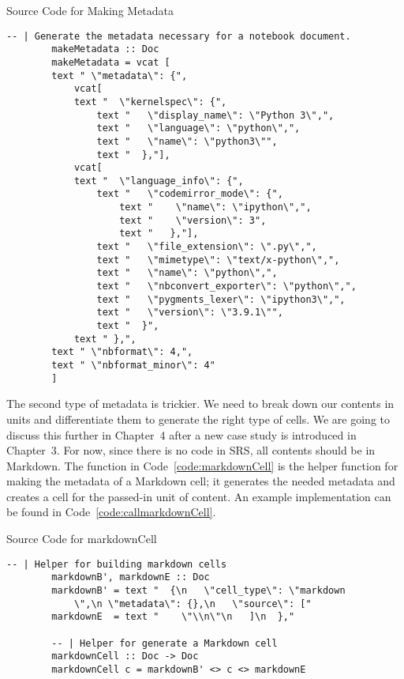 \begin{listing}[h]
	\caption{Source Code for Making Metadata}
	\label{code:makeMetadata}
	\begin{lstlisting}[language=haskell1, basicstyle=\small\ttfamily]
		-- | Generate the metadata necessary for a notebook document.
		makeMetadata :: Doc  
		makeMetadata = vcat [
		text " \"metadata\": {", 
			vcat[
			text "  \"kernelspec\": {", 
				text "   \"display_name\": \"Python 3\",", 
				text "   \"language\": \"python\",",
				text "   \"name\": \"python3\"", 
				text "  },"],
			vcat[
			text "  \"language_info\": {", 
				text "   \"codemirror_mode\": {", 
					text "    \"name\": \"ipython\",",
					text "    \"version\": 3",
					text "   },"],
				text "   \"file_extension\": \".py\",", 
				text "   \"mimetype\": \"text/x-python\",",
				text "   \"name\": \"python\",",
				text "   \"nbconvert_exporter\": \"python\",",
				text "   \"pygments_lexer\": \"ipython3\",",
				text "   \"version\": \"3.9.1\"",
				text "  }",
			text " },",
		text " \"nbformat\": 4,", 
		text " \"nbformat_minor\": 4" 
		]
	\end{lstlisting}
\end{listing}

The second type of metadata is trickier. We need to break down our contents in 
units and differentiate them to generate the right type of cells. We are going 
to discuss this further in Chapter~4  after a new case study is 
introduced in Chapter~3. For now, since there is no code in SRS, 
all contents should be in Markdown. The  function in 
Code~\ref{code:markdownCell} is the helper function for making the metadata of 
a Markdown cell; it generates the needed metadata and creates a cell for the 
passed-in unit of content. An example implementation can be found in 
Code~\ref{code:callmarkdownCell}.

\begin{listing}[h]
	\caption{Source Code for markdownCell}
	\label{code:markdownCell}
	\begin{lstlisting}[language=haskell1]
		-- | Helper for building markdown cells
		markdownB', markdownE :: Doc
		markdownB' = text "  {\n   \"cell_type\": \"markdown
			\",\n \"metadata\": {},\n   \"source\": [" 
		markdownE  = text "    \"\\n\"\n   ]\n  },"
			
		-- | Helper for generate a Markdown cell
		markdownCell :: Doc -> Doc
		markdownCell c = markdownB' <> c <> markdownE
	\end{lstlisting}
\end{listing}

